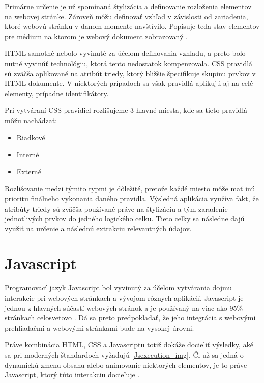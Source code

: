 Primárne určenie je už spomínaná štylizácia a definovanie rozloženia elementov na webovej stránke. Zároveň môžu definovať vzhľad v závislosti od zariadenia, ktoré webovú stránku v danom momente navštívilo. Popisuje teda stav elementov pre médium na ktorom je webový dokument zobrazovaný \cite{CSS}. 

HTML samotné nebolo vyvinuté za účelom definovania vzhľadu, a preto bolo nutné vyvinúť technológiu, ktorá tento nedostatok kompenzovala. CSS pravidlá sú zväčša aplikované na atribút triedy, ktorý bližšie špecifikuje skupinu prvkov v HTML dokumente. V niektorých prípadoch sa však pravidlá aplikujú aj na celé elementy, prípadne identifikátory.

Pri vytváraní CSS pravidiel rozlišujeme 3 hlavné miesta, kde sa tieto pravidlá môžu nachádzať:

\begin{itemize}
    \item {Riadkové}
    \item {Interné}
    \item {Externé}
\end{itemize}

Rozlišovanie medzi týmito typmi je dôležité, pretože každé miesto môže mať inú prioritu finálneho vykonania daného pravidla. Výsledná aplikácia využíva fakt, že atribúty triedy sú zväčša používané práve na štylizáciu a tým zaradenie jednotlivých prvkov do jedného logického celku. Tieto celky sa následne dajú využiť na určenie a následnú extrakciu relevantných údajov.

\section{Javascript}

Programovací jazyk Javascript bol vyvinutý za účelom vytvárania dojmu interakcie pri webových stránkach a vývojom rôznych aplikácií. Javascript je jednou z hlavných súčastí webových stránok a je používaný na viac ako 95\% stránkach celosvetovo \cite{HowPopular}. Dá sa preto predpokladať, že jeho integrácia s webovými prehliadačmi a webovými stránkami bude na vysokej úrovni. 

\bigskip

Práve kombinácia HTML, CSS a Javascriptu totiž dokáže docieliť výsledky, aké sa pri moderných štandardoch vyžadujú \ref{Jsexecution_img}. Či už sa jedná o dynamickú zmenu obsahu alebo animovanie niektorých elementov, je to práve Javascript, ktorý túto interakciu docieľuje \cite{Javascript}. 

